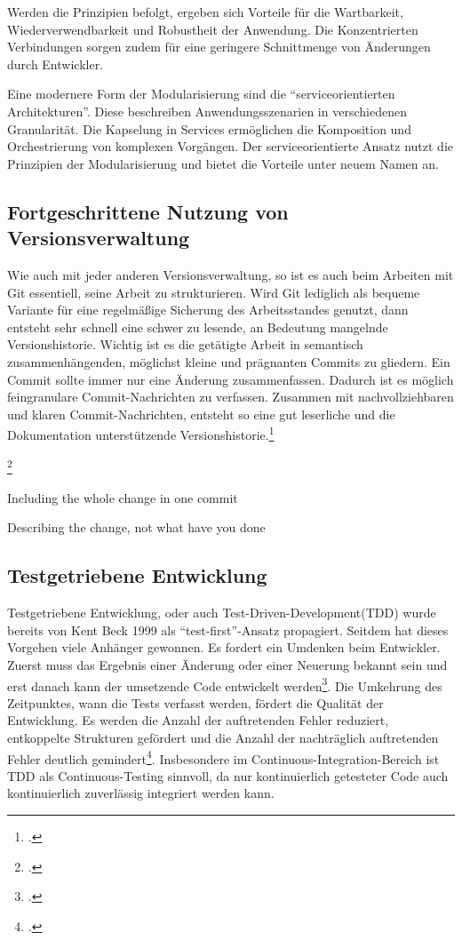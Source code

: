 Werden die Prinzipien befolgt, ergeben sich Vorteile für die Wartbarkeit, Wiederverwendbarkeit und Robustheit der Anwendung. Die Konzentrierten Verbindungen sorgen zudem für eine geringere Schnittmenge von Änderungen durch Entwickler.

Eine modernere Form der Modularisierung sind die ``serviceorientierten Architekturen''. Diese beschreiben Anwendungsszenarien in verschiedenen Granularität. Die Kapselung in Services ermöglichen die Komposition und Orchestrierung von komplexen Vorgängen. Der serviceorientierte Ansatz nutzt die Prinzipien der Modularisierung und bietet die Vorteile unter neuem Namen an.

\subsection{Fortgeschrittene Nutzung von Versionsverwaltung}

Wie auch mit jeder anderen Versionsverwaltung, so ist es auch beim Arbeiten mit Git essentiell, seine Arbeit zu strukturieren. Wird Git lediglich als bequeme Variante für eine regelmäßige Sicherung des Arbeitsstandes genutzt, dann entsteht sehr schnell eine schwer zu lesende, an Bedeutung mangelnde Versionshistorie. Wichtig ist es die getätigte Arbeit in semantisch zusammenhängenden, möglichst kleine und prägnanten Commits zu gliedern. Ein Commit sollte immer nur eine Änderung zusammenfassen. Dadurch ist es möglich feingranulare Commit-Nachrichten zu verfassen.
Zusammen mit nachvollziehbaren und klaren Commit-Nachrichten, entsteht so eine gut leserliche und die Dokumentation unterstützende Versionshistorie.\footcite[vgl.][Kap. Making only one change per commit]{git-essentials-2017}

\footcite[Writing commit messages before starting to code][]{git-essentials-2017}

Including the whole change in one commit

Describing the change, not what have you done

\subsection{Testgetriebene Entwicklung}
\label{test-driven-development}

Testgetriebene Entwicklung, oder auch Test-Driven-Development(TDD) wurde bereits von Kent Beck 1999 als ``test-first''-Ansatz propagiert. Seitdem hat dieses Vorgehen viele Anhänger gewonnen. Es fordert ein Umdenken beim Entwickler. Zuerst muss das Ergebnis einer Änderung oder einer Neuerung bekannt sein und erst danach kann der umsetzende Code entwickelt werden\footcite[vgl.][Kap. Understanding TDD]{tdd-java}. Die Umkehrung des Zeitpunktes, wann die Tests verfasst werden, fördert die Qualität der Entwicklung. Es werden die Anzahl der auftretenden Fehler reduziert, entkoppelte Strukturen gefördert und die Anzahl der nachträglich auftretenden Fehler deutlich gemindert\footcite[vgl.][]{tdd-ci-effectivness}.
Insbesondere im Continuous-Integration-Bereich ist TDD als Continuous-Testing sinnvoll, da nur kontinuierlich getesteter Code auch kontinuierlich zuverlässig integriert werden kann.

